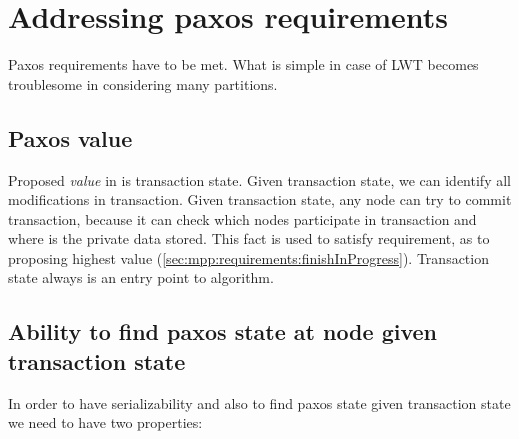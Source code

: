 












\section{Addressing paxos requirements}
Paxos requirements have to be met.
 What is simple in case of LWT becomes troublesome in \mpp considering many partitions. 


\subsection{Paxos value}
Proposed \emph{value} in \mpp is transaction state. Given transaction state, we can identify all modifications in transaction. Given transaction state, any node can try to commit transaction, because it can check which nodes participate in transaction and where is the private data stored. This fact is used to satisfy requirement, as to proposing highest value (\ref{sec:mpp:requirements:finishInProgress}).
Transaction state always is an entry point to algorithm.


\subsection{Ability to find paxos state at node given transaction state}
In order to have serializability and also to find paxos state given transaction state we need to have two properties:

